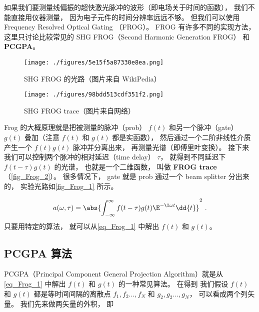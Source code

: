 
\begin{issues}
\issueMissDepend
\end{issues}

如果我们要测量线偏振的超快激光脉冲的波形（即电场关于时间的函数）， 我们不能直接用仪器测量， 因为电子元件的时间分辨率远远不够。 但我们可以使用 Frequency Resolved Optical Gating （FROG）。 FROG 有许多不同的实现方法， 这里只讨论比较常见的 SHG FROG（Second Harmonic Generation FROG） 和 \textbf{PCGPA}。

\begin{figure}[ht]
\centering
\texttt{[image: ./figures/5e15f5a87330e8ea.png]}
\caption{SHG FROG 的光路（图片来自 WikiPedia）} \label{fig_Frog_1}
\end{figure}

\begin{figure}[ht]
\centering
\texttt{[image: ./figures/98bdd513cdf351f2.png]}
\caption{SHG FROG trace（图片来自网络）} \label{fig_Frog_2}
\end{figure}

Frog 的大概原理就是把被测量的脉冲（prob） $f(t)$ 和另一个脉冲（gate） $g(t)$ 叠加（注意 $f(t)$ 和 $g(t)$ 都是实函数）， 然后通过一个二阶非线性介质产生一个 $f(t)g(t)$ 脉冲并分离出来， 再测量光谱（即傅里叶变换）。 接下来我们可以控制两个脉冲的相对延迟（time delay） $\tau$， 就得到不同延迟下 $f(t - \tau)g(t)$ 的光谱， 也就是一个二维函数， 叫做 \textbf{FROG trace}（\autoref{fig_Frog_2}）。 很多情况下， gate 就是 prob 通过一个 beam splitter 分出来的， 实验光路如\autoref{fig_Frog_1} 所示。%

\begin{equation}\label{eq_Frog_1}
a(\omega, \tau) = \abs{\int_{-\infty}^{\infty} f(t-\tau) g(t) \E^{-\I\omega t} \dd{t}}^2~.
\end{equation}
只要用特定的算法， 就可以从\autoref{eq_Frog_1} 中解出 $f(t)$ 和 $g(t)$。

\subsection{PCGPA 算法}

PCGPA（Principal Component General Projection Algorithm）就是从\autoref{eq_Frog_1} 中解出 $f(t)$ 和 $g(t)$ 的一种常见算法。 在得到 我们假设 $f(t)$ 和 $g(t)$ 都是等时间间隔的离散点 $f_1, f_2\dots, f_N$ 和 $g_2, g_2\dots, g_N$， 可以看成两个列矢量。 我们先来做两矢量的外积， 即

